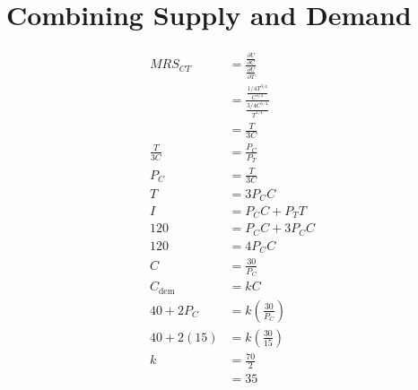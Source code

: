 \documentclass[8pt]{extarticle}
\newcommand{\plain}[1]{\textrm{#1}}
\begin{document}
{\section*{Combining Supply and Demand}
\begin{align*}
	MRS_{CT} &= \frac{\frac{\partial U}{\partial C}}{\frac{\partial U}{\partial T}} \\
	&= \frac{\frac{1/4 T^{3/4}}{C^{3/4}}}{\frac{3/4 C^{1/4}}{T^{1/4}}} \\
	&= \frac{T}{3C} \\
	\frac{T}{3C} &= \frac{P_C}{P_T} \\
	P_C &= \frac{T}{3C} \\
	T &= 3P_C C\\
	I &= P_C C + P_T T \\
	120 &= P_C C + 3P_C C \\
	120 &= 4P_C C \\
	C &= \frac{30}{P_C} \\
	C_{\plain{dem}} &= kC \\
	40 + 2P_{C} &= k\left(\frac{30}{P_C}\right) \\
	40 + 2(15) &= k\left(\frac{30}{15}\right) \\
	k &= \frac{70}{2} \\
	&= \boxed{35}
\end{align*}

}
\end{document}
